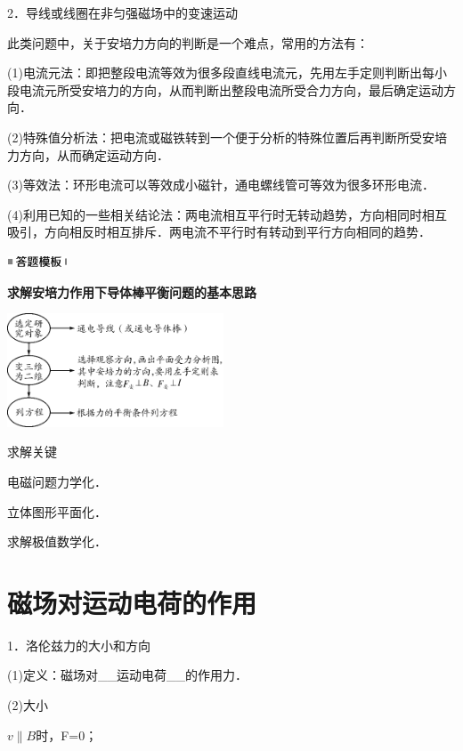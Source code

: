 2．导线或线圈在非匀强磁场中的变速运动

此类问题中，关于安培力方向的判断是一个难点，常用的方法有：

(1)电流元法：即把整段电流等效为很多段直线电流元，先用左手定则判断出每小段电流元所受安培力的方向，从而判断出整段电流所受合力方向，最后确定运动方向．

(2)特殊值分析法：把电流或磁铁转到一个便于分析的特殊位置后再判断所受安培力方向，从而确定运动方向．

(3)等效法：环形电流可以等效成小磁针，通电螺线管可等效为很多环形电流．

(4)利用已知的一些相关结论法：两电流相互平行时无转动趋势，方向相同时相互吸引，方向相反时相互排斥．两电流不平行时有转动到平行方向相同的趋势．


\begin{center}\includegraphics[width=0.70764in,height=0.12292in]{media/image25.png}\end{center}
\begin{center}
	\textbf{求解安培力作用下导体棒平衡问题的基本思路}
\end{center}

\begin{center}\includegraphics[width=2.52847in,height=1.32986in]{media/image345.png}\end{center}

求解关键

电磁问题力学化．

立体图形平面化．

求解极值数学化．

\newpage
\section{磁场对运动电荷的作用}

1．洛伦兹力的大小和方向

(1)定义：磁场对\_\_运动电荷\_\_的作用力．

(2)大小

$v\parallel B$时，F=0；

